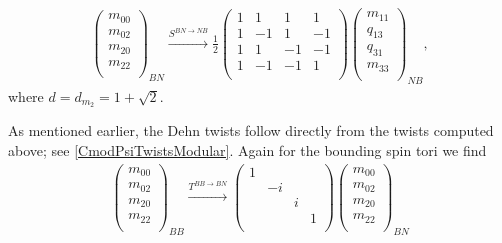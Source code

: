 \begin{align}
\left( \begin{matrix}
m_{00}\\
m_{02}\\
m_{20}\\
m_{22}\\
\end{matrix} \right)_{BN}
\xrightarrow{S^{BN \rightarrow NB}}
\frac{1}{2} \left( \begin{matrix}
1&1&1&1\\
1&-1&1&-1\\
1&1&-1&-1\\
1&-1&-1&1\\
\end{matrix} \right)
\left( \begin{matrix}
m_{11}\\
q_{13}\\
q_{31}\\
m_{33}\\
\end{matrix} \right)_{NB},
\end{align}
where $d= d_{m_2}=1+\sqrt{2}$. 

As mentioned earlier, 
the Dehn twists follow directly from the twists computed above; 
see \eqref{CmodPsiTwistsModular}.
Again for the bounding spin tori we find
\begin{align}
\left( \begin{matrix}
m_{00}\\
m_{02}\\
m_{20}\\
m_{22}\\
\end{matrix} \right)_{BB}
\xrightarrow{T^{BB \rightarrow BN}}
\left( \begin{matrix}
1&&&\\
&-i&&\\
&&i&\\
&&&1\\
\end{matrix} \right)
\left( \begin{matrix}
m_{00}\\
m_{02}\\
m_{20}\\
m_{22}\\
\end{matrix} \right)_{BN}
\end{align}


